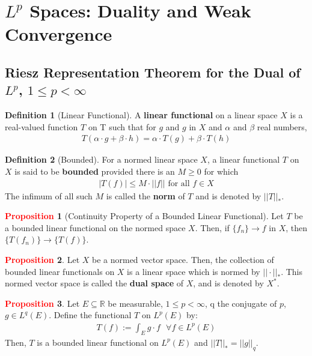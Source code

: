 \documentclass[11pt]{article}
\theoremstyle{definition}
\theoremstyle{definition}
\newcommand{\R}[0]{\mathbb{R}}
\theoremstyle{definition}
\newtheorem{definition}{\textcolor{OliveGreen}{Definition}}
\newtheorem{prop}{\textcolor{red}{Proposition}}
\theoremstyle{remark}
\begin{document}
\section{$L^p$ Spaces: Duality and Weak Convergence}

\subsection{Riesz Representation Theorem for the Dual of $L^p$, $1 \leq p < \infty$}
\begin{definition}[Linear Functional]
	A \textbf{linear functional} on a linear space $X$ is a real-valued function $T$ on T such that for $g$ and $g$ in $X$ and $\alpha$ and $\beta$ real numbers, 
	\begin{align}
		T(\alpha \cdot g + \beta \cdot h ) = \alpha \cdot T(g) + \beta \cdot T(h) 
	\end{align}
\end{definition}

\begin{definition}[Bounded]
	For a normed linear space $X$, a linear functional $T$ on $X$ is said to be \textbf{bounded} provided there is an $M \geq 0$ for which 
	\begin{align}
		|T(f)| \leq M \cdot ||f|| \text{ for all } f \in X
	\end{align}
	The infimum of all such $M$ is called the \textbf{norm} of $T$ and is denoted by $||T||_*$. 
\end{definition}

\begin{prop}[Continuity Property of a Bounded Linear Functional] 
	Let $T$ be a bounded linear functional on the normed space $X$. Then, if $\{ f_n \} \rightarrow f$ in $X$, then $\{ T(f_n) \} \rightarrow \{ T(f) \} $. 
\end{prop}

\begin{prop}
	Let $X$ be a normed vector space. Then, the collection of bounded linear functionals on $X$ is a linear space which is normed by $|| \cdot ||_*$. This normed vector space is called the \textbf{dual space} of $X$, and is denoted by $X^*$. 
\end{prop}

\begin{prop}
	Let $E \subseteq \R$ be measurable, $1 \leq p < \infty$, q the conjugate of $p$, $g \in L^q(E)$. Define the functional $T$ on $L^p(E)$ by: 
	\begin{align}
		T(f) := \int_E g \cdot f \text{ 		} \forall f \in L^p(E) 
	\end{align}
	Then, $T$ is a bounded linear functional on $L^p(E)$ and $||T||_* = ||g||_q$. 
\end{prop}
\end{document}
